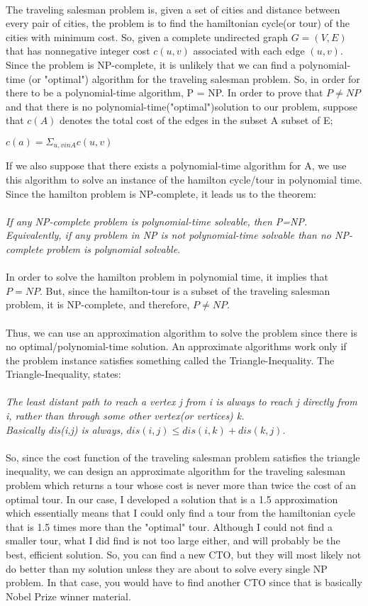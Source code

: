 \documentclass[12pt]{article}
\begin{document}
\\The traveling salesman problem is, given a set of cities and distance between every pair of cities, the problem is to find the hamiltonian cycle(or tour) of the cities with minimum cost. So, given a complete undirected graph $G = (V,E)$ that has nonnegative integer cost $c(u,v)$ associated with each edge $(u,v)$. Since the problem is NP-complete, it is unlikely that we can find a polynomial-time (or "optimal") algorithm for the traveling salesman problem. So, in order for there to be a polynomial-time algorithm, P = NP. In order to prove that $P \neq NP$ and that there is no polynomial-time("optimal")solution to our problem, suppose that $c(A)$ denotes the total cost of the edges in the subset A subset of E;\\\begin{center}
$c(a) = \Sigma_{u,v in A}c(u,v)$ 
\end{center}  
If we also suppose that there exists a polynomial-time algorithm for A, we use this algorithm to solve an instance of the hamilton cycle/tour in polynomial time. Since the hamilton problem is NP-complete, it leads us to the theorem: \\ \\
\textit{If any NP-complete problem is polynomial-time solvable, then P=NP. Equivalently, if any problem in NP is not polynomial-time solvable than no NP-complete problem is polynomial solvable. }\\ \\
In order to solve the hamilton problem in polynomial time, it implies that $P=NP.$ But, since the hamilton-tour is a subset of the traveling salesman problem, it is NP-complete, and therefore, $P \neq NP$. \\\\
Thus, we can use an approximation algorithm to solve the problem since there is no optimal/polynomial-time solution. An approximate algorithms work only if the problem instance satisfies something called the Triangle-Inequality. The Triangle-Inequality, states:\\ \\
\textit{The least distant path to reach a vertex j from i is always to reach j directly from i, rather than through some other vertex(or vertices) k. \\ Basically dis(i,j) is always, $dis(i,j) \leq dis(i,k)+dis(k,j). $} \\ \\ So, since the cost function of the traveling salesman problem satisfies the triangle inequality, we can design an approximate algorithm for the traveling salesman problem which returns a tour whose cost is never more than twice the cost of an optimal tour. In our case, I developed a solution that is a 1.5 approximation which essentially means that I could only find a tour from the hamiltonian cycle that is 1.5 times more than the "optimal" tour. Although I could not find a smaller tour, what I did find is not too large either, and will probably be the best, efficient solution. So, you can find a new CTO, but they will most likely not do better than my solution unless they are about to solve every single NP problem. In that case, you would have to find another CTO since that is basically Nobel Prize winner material. 
 
\pagebreak

\newpage
\mbox{}
\newpage
\pagebreak
\end{document}
